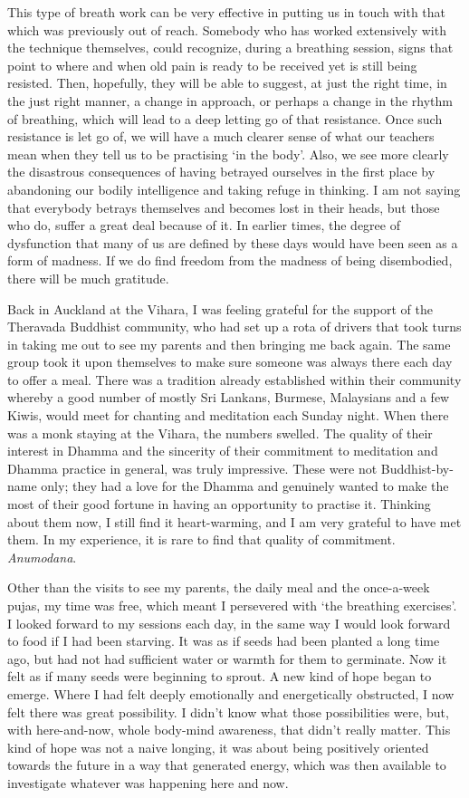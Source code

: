 This type of breath work can be very effective in putting us in touch
with that which was previously out of reach. Somebody who has worked
extensively with the technique themselves, could recognize, during a
breathing session, signs that point to where and when old pain is ready
to be received yet is still being resisted. Then, hopefully, they will
be able to suggest, at just the right time, in the just right manner, a
change in approach, or perhaps a change in the rhythm of breathing,
which will lead to a deep letting go of that resistance. Once such
resistance is let go of, we will have a much clearer sense of what our
teachers mean when they tell us to be practising `in the body'. Also, we
see more clearly the disastrous consequences of having betrayed
ourselves in the first place by abandoning our bodily intelligence and
taking refuge in thinking. I am not saying that everybody betrays
themselves and becomes lost in their heads, but those who do, suffer a
great deal because of it. In earlier times, the degree of dysfunction
that many of us are defined by these days would have been seen as a form
of madness. If we do find freedom from the madness of being disembodied,
there will be much gratitude.

Back in Auckland at the Vihara, I was feeling grateful for the support
of the Theravada Buddhist community, who had set up a rota of drivers
that took turns in taking me out to see my parents and then bringing me
back again. The same group took it upon themselves to make sure someone
was always there each day to offer a meal. There was a tradition already
established within their community whereby a good number of mostly Sri
Lankans, Burmese, Malaysians and a few Kiwis, would meet for chanting
and meditation each Sunday night. When there was a monk staying at the
Vihara, the numbers swelled. The quality of their interest in Dhamma and
the sincerity of their commitment to meditation and Dhamma practice in
general, was truly impressive. These were not Buddhist-by-name only;
they had a love for the Dhamma and genuinely wanted to make the most of
their good \mbox{fortune} in having an opportunity to practise it. Thinking
about them now, I still find it heart-warming, and I am very grateful to
have met them. In my experience, it is rare to find that quality of
commitment. \emph{Anumodana}.

Other than the visits to see my parents, the daily meal and the
once-a-week pujas, my time was free, which meant I persevered with `the
breathing exercises'. I looked forward to my sessions each day, in the
same way I would look forward to food if I had been starving. It was as
if seeds had been planted a long time ago, but had not had sufficient
water or warmth for them to germinate. Now it felt as if many seeds were
beginning to sprout. A new kind of hope began to emerge. Where I had
felt deeply emotionally and energetically obstructed, I now felt there
was great possibility. I didn't know what those possibilities were, but,
with here-and-now, whole body-mind awareness, that didn't really matter.
This kind of hope was not a naive longing, it was about being positively
oriented towards the future in a way that generated energy, which was
then available to investigate whatever was happening here and now.

